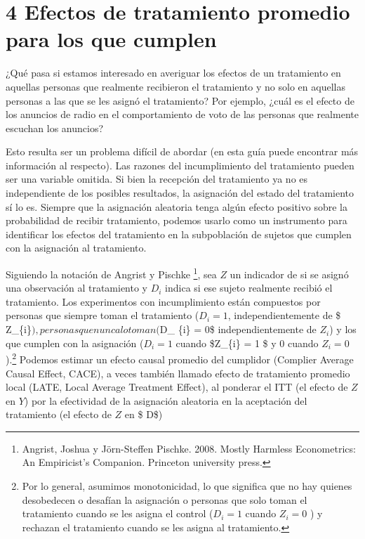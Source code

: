 \documentclass[
]{article}
\begin{document}
\hypertarget{efectos-de-tratamiento-promedio-para-los-que-cumplen}{%
\section{4 Efectos de tratamiento promedio para los que
cumplen}\label{efectos-de-tratamiento-promedio-para-los-que-cumplen}}

¿Qué pasa si estamos interesado en averiguar los efectos de un
tratamiento en aquellas personas que realmente recibieron el tratamiento
y no solo en aquellas personas a las que se les asignó el tratamiento?
Por ejemplo, ¿cuál es el efecto de los anuncios de radio en el
comportamiento de voto de las personas que realmente escuchan los
anuncios?

Esto resulta ser un problema difícil de abordar (en esta guía puede
encontrar más información al respecto). Las razones del incumplimiento
del tratamiento pueden ser una variable omitida. Si bien la recepción
del tratamiento ya no es independiente de los posibles resultados, la
asignación del estado del tratamiento sí lo es. Siempre que la
asignación aleatoria tenga algún efecto positivo sobre la probabilidad
de recibir tratamiento, podemos usarlo como un instrumento para
identificar los efectos del tratamiento en la subpoblación de sujetos
que cumplen con la asignación al tratamiento.

Siguiendo la notación de Angrist y Pischke \footnote{Angrist, Joshua y
  Jörn-Steffen Pischke. 2008. Mostly Harmless Econometrics: An
  Empiricist's Companion. Princeton university press.}, sea \(Z\) un
indicador de si se asignó una observación al tratamiento y \(D_{i}\)
indica si ese sujeto realmente recibió el tratamiento. Los experimentos
con incumplimiento están compuestos por personas que siempre toman el
tratamiento (\(D_{i} = 1\), independientemente de \$
Z\_\{i\}\(), personas que nunca lo toman (\)D\_ \{i\} = 0\$
independientemente de \(Z_ {i}\)) y los que cumplen con la asignación
(\(D_ {i} = 1\) cuando \$Z\_\{i\} = 1 \$ y \(0\) cuando
\(Z_ {i} = 0\)).\footnote{Por lo general, asumimos monotonicidad, lo que
  significa que no hay quienes desobedecen o desafían la asignación o
  personas que solo toman el tratamiento cuando se les asigna el control
  (\(D_{i} = 1\) cuando \(Z_i = 0\) ) y rechazan el tratamiento cuando
  se les asigna al tratamiento.} Podemos estimar un efecto causal
promedio del cumplidor (Complier Average Causal Effect, CACE), a veces
también llamado efecto de tratamiento promedio local (LATE, Local
Average Treatment Effect), al ponderar el ITT (el efecto de \(Z\) en
\(Y\)) por la efectividad de la asignación aleatoria en la aceptación
del tratamiento (el efecto de \(Z\) en \$ D\$)
\end{document}
